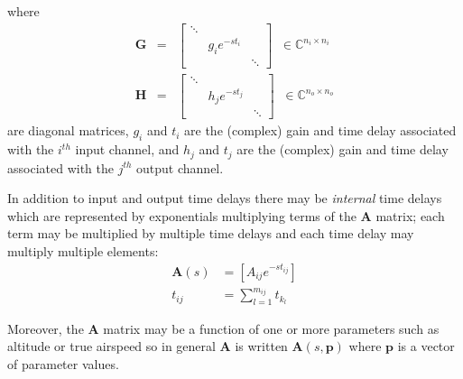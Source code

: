 \documentclass[11pt,openany,twoside]{book}
\numberwithin{equation}{section}		%
\newcommand{\Newterm}[1]{{\em #1}}	%
\newcommand{\Matrix}[1]{\boldsymbol{#1}}
\newcommand{\Vector}[1]{\boldsymbol{#1}}
\begin{document}
where
\begin{eqnarray}
\Matrix{G} &=& \left[ \begin{array}{ccc}
\ddots &           &        \\
       & g_i e^{-st_i} &        \\
       &           & \ddots
\end{array}
\right] \;\; \in \mathbb{C}^{n_i \times n_i}	\nonumber	\\
\Matrix{H} &=& \left[ \begin{array}{ccc}
\ddots &           &        \\
       & h_j e^{-st_j} &        \\
       &           & \ddots
\end{array}
\right]	\;\; \in \mathbb{C}^{n_o \times n_o}	\nonumber
\end{eqnarray}
are diagonal matrices, $g_i$ and $t_i$ are the (complex) gain
and time delay associated with the $i^{th}$ input channel, and
$h_j$ and $t_j$ are the (complex) gain and time delay associated with
the $j^{th}$ output channel.

In addition to input and output time delays there may be
\Newterm{internal} time delays which are represented by exponentials
multiplying terms of the $\Matrix{A}$ matrix; each term may be
multiplied by multiple time delays and each time delay may multiply
multiple elements:
\begin{equation}
\begin{split}
\Matrix{A}(s) &= \left[ A_{ij} e^{-st_{ij}} \right] \\
t_{ij} &= \sum_{l=1}^{m_{ij}} t_{k_l}
\end{split}		\nonumber
\end{equation}

Moreover, the $\Matrix{A}$ matrix may be a function of one or more parameters
such as altitude or true airspeed so in general $\Matrix{A}$ is written
$\Matrix{A}(s,\Vector{p})$ where $\Vector{p}$ is a vector of parameter values.
\end{document}

